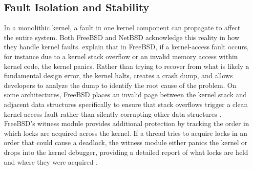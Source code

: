 \subsection{Fault Isolation and Stability}
In a monolithic kernel, a fault in one kernel component can propagate to affect the entire system. Both FreeBSD and NetBSD acknowledge this reality in how they handle kernel faults. \textcite{watson2015} explain that in FreeBSD, if a kernel-access fault occurs, for instance due to a kernel stack overflow or an invalid memory access within kernel code, the kernel panics. Rather than trying to recover from what is likely a fundamental design error, the kernel halts, creates a crash dump, and allows developers to analyze the dump to identify the root cause of the problem. On some architectures, FreeBSD places an invalid page between the kernel stack and adjacent data structures specifically to ensure that stack overflows trigger a clean kernel-access fault rather than silently corrupting other data structures \parencite{watson2015}.
FreeBSD's witness module provides additional protection by tracking the order in which locks are acquired across the kernel. If a thread tries to acquire locks in an order that could cause a deadlock, the witness module either panics the kernel or drops into the kernel debugger, providing a detailed report of what locks are held and where they were acquired \parencite{watson2015}.

